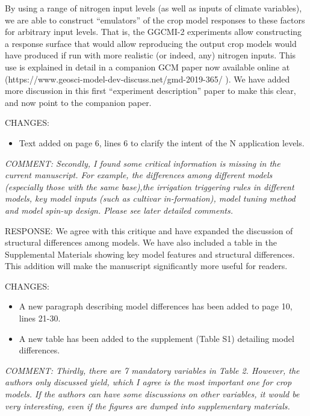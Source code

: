 \documentclass[gmd, manuscript]{copernicus} %
\begin{document}
By using a range of nitrogen input levels (as well as inputs of climate variables), we are able to construct “emulators” of the crop model responses to these factors for arbitrary input levels. That is, the GGCMI-2 experiments allow constructing a response surface that would allow reproducing the output crop models would have produced  if run with more realistic (or indeed, any) nitrogen inputs. This use is explained in detail in a companion GCM paper now available online at (https://www.geosci-model-dev-discuss.net/gmd-2019-365/ ). We have added more discussion in this first “experiment description” paper to make this clear, and now point to the companion paper.
\smallskip

CHANGES:
\begin{itemize}
    \item Text added on page 6, lines 6 to clarify the intent of the N application levels.
\end{itemize}

\smallskip

\textcolor{dark-gray}{\textit{COMMENT: Secondly, I found some critical information is missing in the current manuscript. For example, the differences among different models (especially those with the same base),the irrigation triggering rules in different models, key model inputs (such as cultivar in-formation), model tuning method and model spin-up design. Please see later detailed comments. }}

RESPONSE: We agree with this critique and have expanded the discussion of structural differences among models. We have also included a table in the Supplemental Materials showing key model features and structural differences. This addition will make the manuscript significantly more useful for readers.
\smallskip

CHANGES:
\begin{itemize}
    \item A new paragraph describing model differences has been added to page 10, lines 21-30.
    \item A new table has been added to the supplement (Table S1) detailing model differences.
\end{itemize}

\smallskip

\textcolor{dark-gray}{\textit{COMMENT: Thirdly, there are 7 mandatory variables in Table 2. However, the authors only discussed yield, which I agree is the most important one for crop models. If the authors can have some discussions on other variables, it would be very interesting, even if the figures are dumped into supplementary materials.}} 
\end{document}
